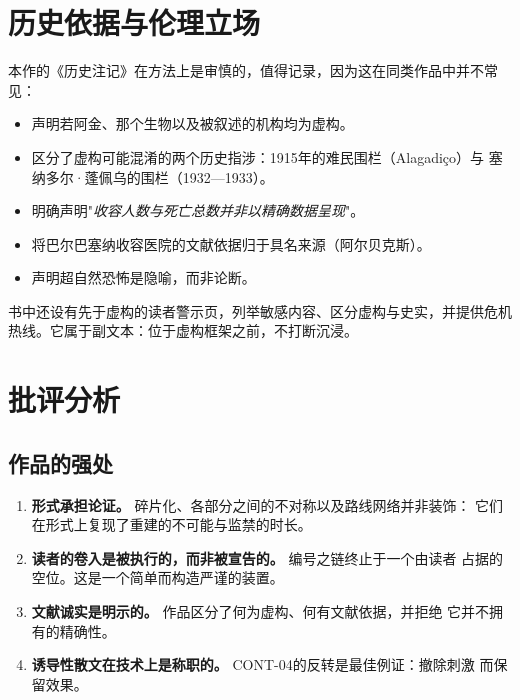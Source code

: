 \documentclass[11pt,a4paper]{article}
\begin{document}
\section{历史依据与伦理立场}
\label{sec:etica}

本作的《历史注记》在方法上是审慎的，值得记录，因为这在同类作品中并不常见：

\begin{itemize}
\item 声明若阿金、那个生物以及被叙述的机构均为虚构。
\item 区分了虚构可能混淆的两个历史指涉：1915年的难民围栏（Alagadiço）与
塞纳多尔·蓬佩乌的围栏（1932—1933）。
\item 明确声明"\textit{收容人数与死亡总数并非以精确数据呈现}"。
\item 将巴尔巴塞纳收容医院的文献依据归于具名来源（阿尔贝克斯）。
\item 声明超自然恐怖是隐喻，而非论断。
\end{itemize}

书中还设有先于虚构的读者警示页，列举敏感内容、区分虚构与史实，并提供危机
热线。它属于副文本：位于虚构框架之前，不打断沉浸。

\section{批评分析}
\label{sec:critica}

\subsection{作品的强处}

\begin{enumerate}
\item \textbf{形式承担论证。} 碎片化、各部分之间的不对称以及路线网络并非装饰：
它们在形式上复现了重建的不可能与监禁的时长。

\item \textbf{读者的卷入是被执行的，而非被宣告的。} 编号之链终止于一个由读者
占据的空位。这是一个简单而构造严谨的装置。

\item \textbf{文献诚实是明示的。} 作品区分了何为虚构、何有文献依据，并拒绝
它并不拥有的精确性。

\item \textbf{诱导性散文在技术上是称职的。} CONT-04的反转是最佳例证：撤除刺激
而保留效果。
\end{enumerate}
\end{document}
